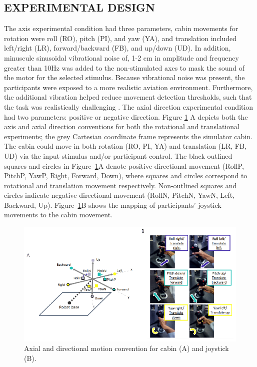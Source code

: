 \documentclass{ieeeaccess}
\begin{document}
\subsection{EXPERIMENTAL DESIGN}
\label{EXPERIMENTAL_DESIGN}
The axis experimental condition had three parameters, cabin movements for rotation were roll (RO), pitch (PI), and yaw (YA), and translation included left/right (LR), forward/backward (FB), and up/down (UD). In addition, minuscule sinusoidal vibrational noise of, 1-2 cm in amplitude and frequency greater than 10Hz was added to the non-stimulated axes to mask the sound of the motor for the selected stimulus. Because vibrational noise was present, the participants were exposed to a more realistic aviation environment. Furthermore, the additional vibration helped reduce movement detection thresholds, such that the task was realistically challenging \cite{Chaudhuri_2013_Wholebody}. The axial direction experimental condition had two parameters: positive or negative direction. Figure \ref{fig1} A depicts both the axis and axial direction conventions for both the rotational and translational experiments; the grey Cartesian coordinate frame represents the simulator cabin. The cabin could move in both rotation (RO, PI, YA) and translation (LR, FB, UD) via the input stimulus and/or participant control. The black outlined squares and circles in Figure~\ref{fig1}A denote positive directional movement (RollP, PitchP, YawP, Right, Forward, Down), where squares and circles correspond to rotational and translation movement respectively. Non-outlined squares and circles indicate negative directional movement (RollN, PitchN, YawN, Left, Backward, Up). Figure~\ref{fig1}B shows the mapping of participants’ joystick movements to the cabin movement.

\begin{figure}[htp]
\begin{center}
\includegraphics[width=1.0\linewidth]{figures/figure1.eps}
\end{center}
\caption{Axial and directional motion convention for cabin (A) and joystick (B).}
\label{fig1}
\end{figure}
\end{document}
